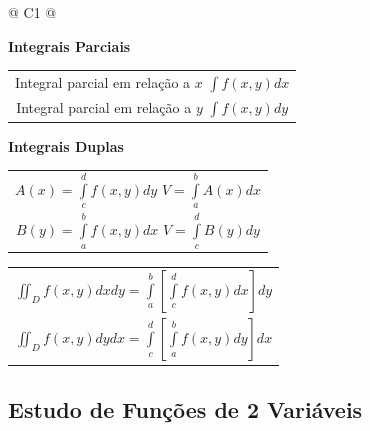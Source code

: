 		\begin{longtable}{
		@{}
		C{1\textwidth} 
		@{}}

			\toprule
			\textbf{Integrais Parciais}
			\tabularnewline
			\midrule
			{\large \begin{tabular}[c]{@{}c@{}}

				Integral parcial em relação a $x$ \hspace{1cm} $\int f(x, y) dx$ \\

				Integral parcial em relação a $y$ \hspace{1cm} $\int f(x, y) dy$


			\end{tabular}}
			\tabularnewline
			\midrule
			\textbf{Integrais Duplas}
			\tabularnewline
			\midrule
			{\large \begin{tabular}[c]{@{}c@{}}

				$A(x) = \int \limits^{d}_{c} f(x, y)dy$ \hspace{1cm} $V = \int \limits^{b}_{a} A(x)dx$ \\

				$B(y) = \int \limits^{b}_{a} f(x, y)dx$ \hspace{1cm} $V = \int \limits^{d}_{c} B(y)dy$

			\end{tabular}}
			\tabularnewline
			\midrule
			{\large \begin{tabular}[c]{@{}c@{}}

				$\iint_{D} f(x, y)dxdy = \int \limits^{b}_{a} \left[ \int \limits^{d}_{c} f(x, y)dx \right] dy$ \\

				$\iint_{D} f(x, y)dydx = \int \limits^{d}_{c} \left[ \int \limits^{b}_{a} f(x, y)dy \right] dx$

			\end{tabular}}
			\tabularnewline
			\bottomrule

		\end{longtable}

	\subsection{Estudo de Funções de 2 Variáveis}

